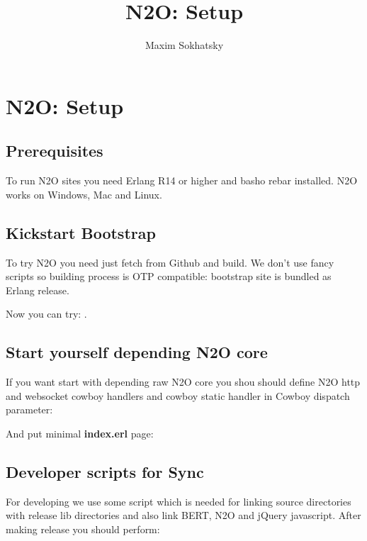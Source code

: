 \documentclass[11pt]{article}
\begin{document}
\title{N2O: Setup}
\author{Maxim Sokhatsky}

\paragraph{}
\section*{N2O: Setup}

\subsection*{Prerequisites}
To run N2O sites you need Erlang R14 or higher and basho rebar installed.
N2O works on Windows, Mac and Linux.

\subsection*{Kickstart Bootstrap}
To try N2O you need just fetch from Github and build. We don't use
fancy scripts so building process is OTP compatible: bootstrap site
is bundled as Erlang release.


Now you can try: .


\subsection*{Start yourself depending N2O core}
If you want start with depending raw N2O core you shou should 
define N2O http and websocket cowboy handlers and cowboy static
handler in Cowboy dispatch parameter:


And put minimal {\bf index.erl} page:


\subsection*{Developer scripts for Sync}
For developing we use some script which is needed for linking source
directories with release lib directories and also link BERT, N2O and jQuery javascript.
After making release you should perform:
\end{document}
